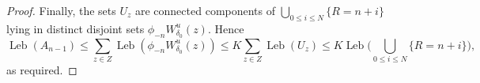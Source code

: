 \documentclass[10pt,a4paper]{amsart}
\newcommand{\Leb}{\operatorname{Leb}}
\begin{document}
\begin{proof}
Finally, the sets $U_z$ are connected components of $\bigcup_{0\le i\le N}\{R=n+i\}$ lying in distinct disjoint sets $\phi_{-n}W^u_{\delta_0}(z)$.
Hence 
\[
\Leb(A_{n-1})  
 \le \sum_{z\in Z} \Leb(\phi_{-n}W^u_{\delta_0}(z))
 \le K \sum_{z\in Z}\Leb(U_z) \le 
K\Leb\Big(\bigcup_{0\le i\le N}\{R=n+i\}\Big),
\]
as required.
\end{proof}
\end{document}
